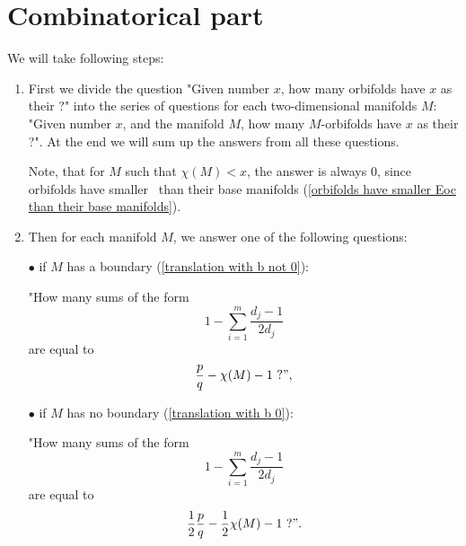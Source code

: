 \section{Combinatorical part}\label{combinatorical part}
We will take following steps:
\begin{enumerate}
\item First we divide the question "Given number $x$, how many orbifolds have $x$ as their \Eoc?" 
into the series of questions 
for each two-dimensional manifolds $M$:
"Given number $x$, and the manifold $M$, how many $M$-orbifolds have $x$ as their \Eoc?". 
At the end we will sum up the answers from all these questions. 

Note, that for $M$ such that $\chi(M) < x$, the answer is always $0$, since 
orbifolds have smaller \Eoc\ than their base manifolds 
(\ref{orbifolds have smaller Eoc than their base manifolds}).
\item Then for each manifold $M$, we answer one of the following questions: 

$\bullet$ if $M$ has a boundary (\ref{translation with b not 0}): 

"How many sums of the form 
\begin{equation}
1-\sum_{i=1}^m \frac{d_j-1}{2d_j} 
\end{equation}
are equal to 
\begin{equation}
\frac{p}{q} - \chi(M) - 1 \ ?", 
\end{equation}




$\bullet$ if $M$ has no boundary (\ref{translation with b 0}): 

"How many sums of the form
\begin{equation}
1-\sum_{i=1}^m \frac{d_j-1}{2d_j} 
\end{equation}
are equal to 
\begin{equation}
\frac{1}{2}\frac{p}{q} - \frac{1}{2}\chi(M) -1\ ?".
\end{equation}


\end{enumerate}
